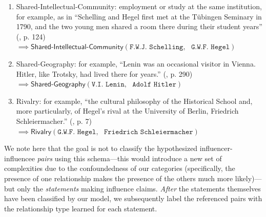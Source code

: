 \documentclass[11pt]{article}
\newcommand{\entity}[1]{\texttt{#1}}
\begin{document}
\begin{enumerate}
	\item \textsf{Shared-Intellectual-Community}: employment or study at the same institution, for example, as in ``Schelling and Hegel first met at the Tübingen Seminary in 1790, and the two young men shared a room there during their student years'' (\cite{levine_divergent_2006}, p. 124) \\
	$\implies \textsf{Shared-Intellectual-Community}(\entity{F.W.J. Schelling},\text{ }\entity{G.W.F. Hegel})$
	
	\item \textsf{Shared-Geography}: for example, ``Lenin was an occasional visitor in Vienna. Hitler, like Trotsky, had lived there for years.'' (\cite{morton_thunder_1990}, p. 290) \\
	$\implies \textsf{Shared-Geography}(\entity{V.I. Lenin},\text{ }\entity{Adolf Hitler})$
	
	\item \textsf{Rivalry}: for example, ``the cultural philosophy of the Historical School and, more particularly, of Hegel's rival at the University of Berlin, Friedrich Schleiermacher.'' (\cite{toews_hegelianism_1985}, p. 7) \\
	$\implies \textsf{Rivalry}(\entity{G.W.F. Hegel},\text{ }\entity{Friedrich Schleiermacher})$
\end{enumerate}

We note here that the goal is not to classify the hypothesized influencer-influencee \textit{pairs} using this schema---this would introduce a new set of complexities due to the confoundedness of our categories (specifically, the presence of one relationship makes the presence of the others much more likely)---but only the \textit{statements} making influence claims. \textit{After} the statements themselves have been classified by our model, we subsequently label the referenced pairs with the relationship type learned for each statement.
\end{document}
